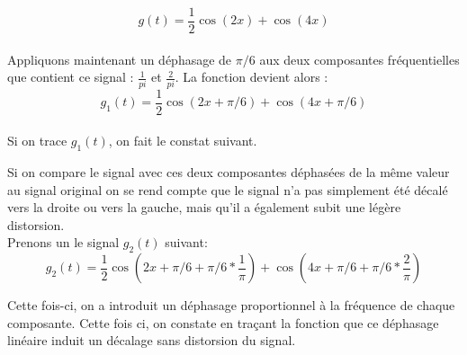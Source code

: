 \documentclass[11pt,a4paper]{article}
\begin{document}
\[ g(t) = \frac{1}{2} \cos(2 x) + \cos(4 x) \]\\

Appliquons maintenant un déphasage de $\pi/6$ aux  deux composantes fréquentielles que contient ce signal : $\frac{1}{pi}$  et $\frac{2}{pi}$. La fonction devient alors : \\

\[ g_1(t) = \frac{1}{2} \cos(2 x + \pi/6) + \cos(4 x +  \pi/6) \]\\

Si on trace $g_1(t)$, on fait le constat suivant.

\begin{center}
\end{center}

Si on compare le signal avec ces deux composantes déphasées de la même valeur au signal original on se rend compte que le signal n'a pas simplement été décalé vers la droite ou vers la gauche, mais qu'il a également subit une légère distorsion.\\

Prenons un le signal $g_2(t)$ suivant: 
\[ g_2(t) = \frac{1}{2} \cos(2 x + \pi/6 + \pi/6*\frac{1}{\pi}) + \cos(4 x +  \pi/6 + \pi/6*\frac{2}{\pi})  \]

Cette fois-ci, on a introduit un déphasage proportionnel à la fréquence de chaque composante. Cette fois ci, on constate en traçant la fonction que ce déphasage linéaire induit un décalage sans distorsion du signal.

\begin{center}
\end{center}
\end{document}
